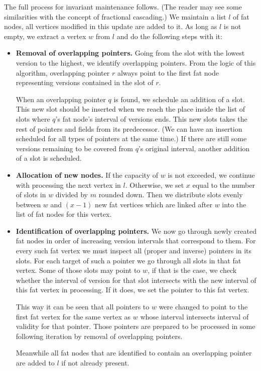 The full process for invariant maintenance follows. 
(The reader may see some similarities with the concept of fractional cascading.) 
We maintain a list $l$ of fat nodes, all vertices modified in this update are added to it. 
As long as $l$ is not empty, we extract a vertex $w$ from $l$ and do the following steps with it:

\begin{itemize}
\item {\bf Removal of overlapping pointers.} Going from the slot with the lowest version to the highest, we identify overlapping pointers. From the logic of this algorithm, overlapping pointer $r$ always point to the first fat node representing versions contained in the slot of $r$. 

When an overlapping pointer $q$ is found, we schedule an addition of a slot. This new slot should be inserted when we reach the place inside the list of slots where $q$'s fat node's interval of versions ends. This new slots takes the rest of pointers and fields from its predecessor. (We can have an insertion scheduled for all types of pointers at the same time.) If there are still some versions remaining to be covered from $q$'s original interval, another addition of a slot is scheduled.

\item {\bf Allocation of new nodes.} If the capacity of $w$ is not exceeded, we continue with processing the next vertex in $l$. Otherwise, we set $x$ equal to the number of slots in $w$ divided by $m$ rounded down. Then we distribute slots evenly between $w$ and $(x-1)$ new fat vertices which are linked after $w$ into the list of fat nodes for this vertex.

\item {\bf Identification of overlapping pointers.} We now go through newly created fat nodes in order of increasing version intervals that correspond to them. For every such fat vertex we must inspect all (proper and inverse) pointers in its slots. For each target of such a pointer we go through all slots in that fat vertex. Some of those slots may point to $w$, if that is the case, we check whether the interval of version for that slot intersects with the new interval of this fat vertex in processing. If it does, we set the pointer to this fat vertex.

This way it can be seen that all pointers to $w$ were changed to point to the first fat vertex for the same vertex as $w$ whose interval intersects interval of validity for that pointer. Those pointers are prepared to be processed in some following iteration by removal of overlapping pointers.

Meanwhile all fat nodes that are identified to contain an overlapping pointer are added to $l$ if not already present.
\end{itemize}

